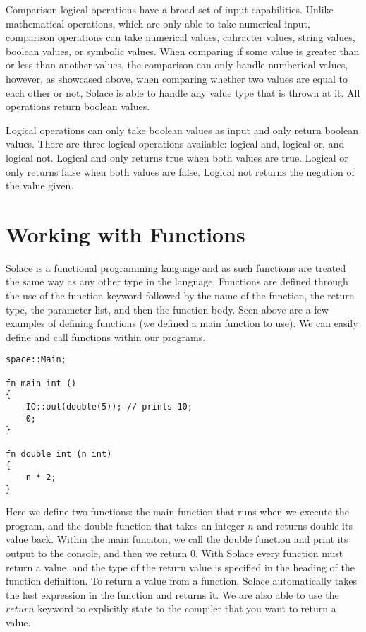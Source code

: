 \documentclass{article}
\begin{document}
Comparison logical operations have a broad set of input capabilities. Unlike mathematical operations, which are only able to take numerical input,
comparison operations can take numerical values, cahracter values, string values, boolean values, or symbolic values. When comparing if some value is
greater than or less than another values, the comparison can only handle numberical values, however, as showcased above, when comparing whether two
values are equal to each other or not, Solace is able to handle any value type that is thrown at it. All operations return boolean values.

Logical operations can only take boolean values as input and only return boolean values. There are three logical operations available: logical and,
logical or, and logical not. Logical and only returns true when both values are true. Logical or only returns false when both values are false.
Logical not returns the negation of the value given.


\section{Working with Functions}

Solace is a functional programming language and as such functions are treated the same way as any other type in the language. Functions are defined through
the use of the function keyword followed by the name of the function, the return type, the parameter list, and then the function body. Seen above are a few
examples of defining functions (we defined a main function to use). We can easily define and call functions within our programs.

\begin{lstlisting}
space::Main;

fn main int ()
{
	IO::out(double(5)); // prints 10;
	0;
}

fn double int (n int)
{
	n * 2;
}
\end{lstlisting}

Here we define two functions: the main function that runs when we execute the program, and the double function that takes an integer $n$ and returns
double its value back. Within the main funciton, we call the double function and print its output to the console, and then we return $0$. With Solace
every function must return a value, and the type of the return value is specified in the heading of the function definition. To return a value from
a function, Solace automatically takes the last expression in the function and returns it. We are also able to use the $return$ keyword to explicitly
state to the compiler that you want to return a value.
\end{document}

